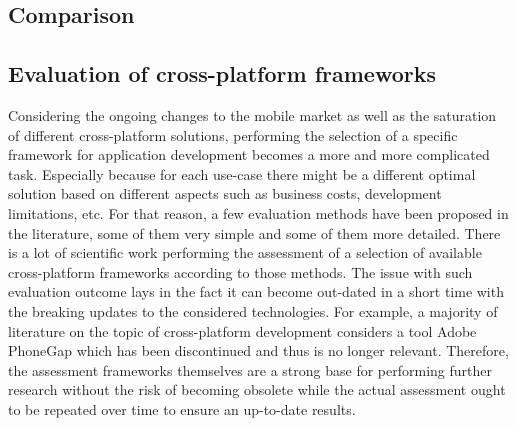 \subsection{Comparison}


\subsection{Evaluation of cross-platform frameworks}

Considering the ongoing changes to the mobile market as well as the saturation of different cross-platform solutions, performing the selection of a specific framework for application development becomes a more and more complicated task. Especially because for each use-case there might be a different optimal solution based on different aspects such as business costs, development limitations, etc. For that reason, a few evaluation methods have been proposed in the literature, some of them very simple and some of them more detailed. There is a lot of scientific work performing the assessment of a selection of available cross-platform frameworks according to those methods. The issue with such evaluation outcome lays in the fact it can become out-dated in a short time with the breaking updates to the considered technologies. For example, a majority of literature on the topic of cross-platform development considers a tool Adobe PhoneGap which has been discontinued and thus is no longer relevant. Therefore, the assessment frameworks themselves are a strong base for performing further research  without the risk of becoming obsolete while the actual assessment ought to be repeated over time to ensure an up-to-date results.

